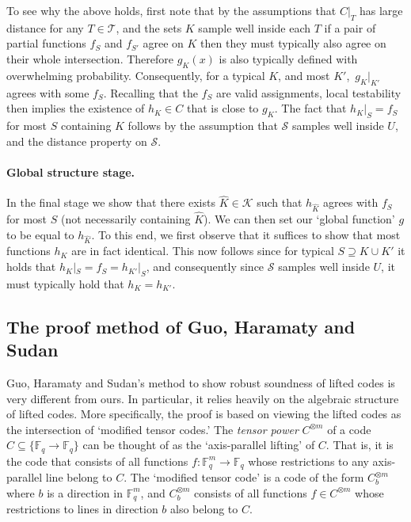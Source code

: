 \documentclass{toc}
\theoremstyle{plain}
\newcommand{\F}{{\mathbb{F}}}
\newcommand{\calT}{{\mathcal{T}}}
\newcommand{\calS}{{\mathcal{S}}}
\newcommand{\calK}{{\mathcal{K}}}
\begin{document}
To see why the above holds, first note that by the assumptions 
that $C|_T$ has large distance %
for any $T \in \calT$, 
 and the sets $K$  %
sample well inside %
each $T$  %
%
if a pair of %
partial functions $f_S$ and $f_{S'}$  %
agree on $K$ then they must typically also agree on their whole intersection. Therefore $g_K(x)$ is also typically defined with overwhelming probability. Consequently, for a typical $K$, and most $K'$,\ $g_K|_{K'}$ agrees with some $f_S$. Recalling that
%
the $f_S$ are  %
valid assignments, local testability then implies the existence of $h_K \in C$ that is close to $g_K$. The fact that $h_K|_S = f_S$ for most $S$ containing
$K$ follows by the assumption that $\calS$ samples well
inside  %
$U$, and the distance property on $\calS$. 

\paragraph{Global structure stage.} In the final stage we show that there 
exists %
${\hat K}\in \calK$  %
such that $h_{\hat K}$ agrees with $f_S$ for most $S$ (not necessarily 
containing $\hat K$). We can then set our
`global function' %
$g$ to be equal to $h_{\hat K}$.
To this end, we first observe that it suffices to show that most functions
$h_K$ are in fact identical.
This now follows since for typical $S \supseteq K\cup K'$ it holds that 
$h_K|_S = f_S = h_{K'}|_S$, and consequently since $\calS$
samples %
well inside $U$,  %
it must typically hold that $h_K=h_{K'}$.
%
%

\subsection{The proof method of Guo, Haramaty and Sudan}\label{subsec:proof-prev}

%
Guo, Haramaty and Sudan's method \cite{GuoHS2015} %
%
to show  %
robust soundness of lifted codes is very different from ours. In particular, it relies heavily on the algebraic structure of lifted codes. More specifically, the proof is based on viewing the lifted codes as the intersection of
`modified tensor codes.'  %
%
%
The \emph{tensor power}   %
$C^{\otimes m}$ of a code $C \subseteq \{ \F_q \to \F_q\}$ can be 
thought of as the
`axis-parallel lifting'  %
of $C$. That is, it is the code that consists of all functions
 $f: \F_q^m \to \F_q$ whose restrictions to
any axis-parallel line belong to $C$. The
`modified tensor code'   %
is a code of the form $C^{\otimes m}_{b}$ where $b$ is a direction in $\F_q^m$,
and $C^{\otimes m}_{b}$ consists of all functions $f \in C^{\otimes m}$ whose 
restrictions to lines in direction $b$  also belong to $C$.
\end{document}
